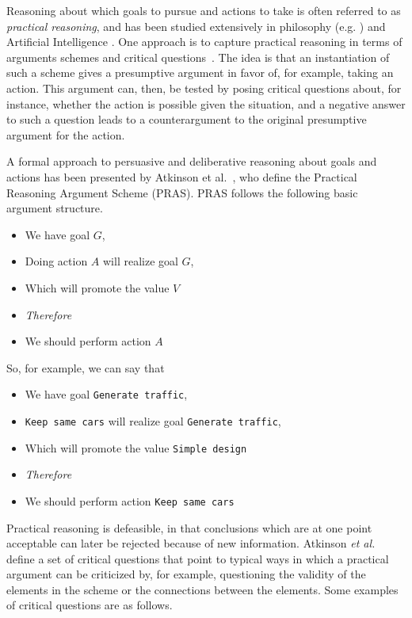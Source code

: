 Reasoning about which goals to pursue and actions to take is often referred to as \emph{practical reasoning}, and has been studied extensively in philosophy (e.g. \cite{Raz1978-RAZPR,walton1990}) and Artificial Intelligence \cite{Bratman1987,atkinson2007}. One approach is to capture practical reasoning in terms of arguments schemes and critical questions~\cite{walton1990}. The idea is that an instantiation of such a scheme gives a presumptive argument in favor of, for example, taking an action. This argument can, then, be tested by posing critical questions about, for instance, whether the action is possible given the situation, and a negative answer to such a question leads to a counterargument to the original presumptive argument for the action. 

A formal approach to persuasive and deliberative reasoning about goals and actions has been presented by Atkinson et al.~\cite{atkinson2007}, who define the Practical Reasoning Argument Scheme (PRAS). PRAS follows the following basic argument structure. 

\begin{itemize}
\item[] We have goal $G$,
\item[] Doing action $A$ will realize goal $G$,
\item[] Which will promote the value $V$
\item[] \textit{Therefore} 
\item[] We should perform action $A$
\end{itemize}

So, for example, we can say that 
\begin{itemize}
\item[] We have goal  \texttt{Generate traffic},
\item[]  \texttt{Keep same cars} will realize goal  \texttt{Generate traffic},
\item[] Which will promote the value  \texttt{Simple design}
\item[] \textit{Therefore} 
\item[] We should perform action  \texttt{Keep same cars}
\end{itemize}

Practical reasoning is defeasible, in that conclusions which are at one point acceptable can later be rejected because of new information. Atkinson \emph{et al.}~\cite{atkinson2007} define a set of critical questions that point to typical ways in which a practical argument can be criticized by, for example, questioning the validity of the elements in the scheme or the connections between the elements. Some examples of critical questions are as follows.

